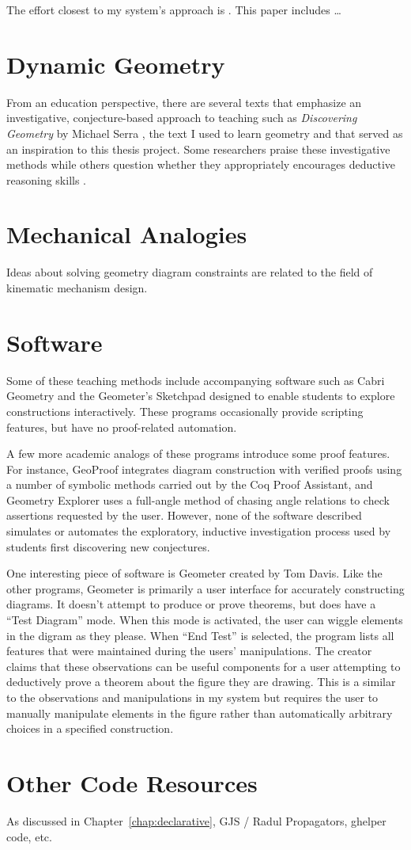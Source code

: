 The effort closest to my system's approach is \cite{fromImages}. This
paper includes \ldots

\section{Dynamic Geometry}
From an education perspective, there are several texts that emphasize
an investigative, conjecture-based approach to teaching such as
\emph{Discovering Geometry} by Michael Serra \cite{serraDiscovering},
the text I used to learn geometry and that served as an inspiration to
this thesis project.  Some researchers praise these investigative
methods \cite{geoTransformations} while others question whether they
appropriately encourages deductive reasoning skills
\cite{geoTeaching}.

\section{Mechanical Analogies}

Ideas about solving geometry diagram constraints are related to the
field of kinematic mechanism design.

\section{Software}
Some of these teaching methods include accompanying software such as
Cabri Geometry \cite{cabri} and the Geometer's Sketchpad
\cite{geoSketchpad} designed to enable students to explore
constructions interactively.  These programs occasionally provide
scripting features, but have no proof-related automation.

A few more academic analogs of these programs introduce some proof
features.  For instance, GeoProof \cite{geoProof} integrates diagram
construction with verified proofs using a number of symbolic methods
carried out by the Coq Proof Assistant, and Geometry Explorer
\cite{geoExplorer} uses a full-angle method of chasing angle relations
to check assertions requested by the user.  However, none of the
software described simulates or automates the exploratory, inductive
investigation process used by students first discovering new
conjectures.

One interesting piece of software is Geometer \cite{geometer} created
by Tom Davis. Like the other programs, Geometer is primarily a user
interface for accurately constructing diagrams. It doesn't attempt to
produce or prove theorems, but does have a ``Test Diagram'' mode. When
this mode is activated, the user can wiggle elements in the digram as
they please. When ``End Test'' is selected, the program lists all
features that were maintained during the users' manipulations. The
creator claims that these observations can be useful components for a
user attempting to deductively prove a theorem about the figure they
are drawing. This is a similar to the observations and manipulations
in my system but requires the user to manually manipulate elements in
the figure rather than automatically arbitrary choices in a specified
construction.

\section{Other Code Resources}

As discussed in Chapter~\ref{chap:declarative},
GJS / Radul Propagators, ghelper code, etc.
